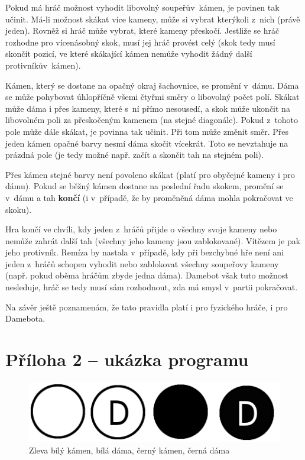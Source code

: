 \documentclass[a4paper,12pt]{article}
\newcommand{\priloha}[1]{\section*{#1}\addcontentsline{toc}{section}{#1}}
\begin{document}
	Pokud má hráč možnost vyhodit libovolný soupeřův~kámen, je povinen tak učinit. Má-li možnost skákat více kameny,
	může si vybrat kterýkoli z~nich (právě jeden). Rovněž si hráč může vybrat, které kameny přeskočí. Jestliže se hráč
	rozhodne pro vícenásobný skok, musí jej hráč provést celý (skok tedy musí skončit pozicí, ve které skákající kámen
	nemůže vyhodit žádný další protivníkův~kámen).
	
	Kámen, který se dostane na opačný okraj šachovnice, se promění v~dámu. Dáma se může pohybovat úhlopříčně všemi čtyřmi
	směry o libovolný počet polí. Skákat může dáma i přes kameny, které s~ní přímo nesousedí, a skok může ukončit na
	libovolném poli za přeskočeným kamenem (na stejné diagonále). Pokud z~tohoto pole může dále skákat, je povinna tak
	učinit. Při tom může změnit směr. Přes jeden kámen opačné barvy nesmí dáma skočit vícekrát. Toto se nevztahuje na prázdná
	pole (je tedy možné např. začít a skončit tah na stejném poli).
	
	Přes kámen stejné barvy není povoleno skákat (platí pro obyčejné kameny i pro dámu). Pokud se běžný kámen dostane
	na poslední řadu skokem, promění se v~dámu a tah \textbf{končí} (i v~případě, že by proměněná dáma mohla pokračovat
	ve skoku).
	
	Hra končí ve chvíli, kdy jeden z~hráčů přijde o všechny svoje kameny nebo nemůže zahrát další tah (všechny jeho kameny
	jsou zablokované). Vítězem je pak jeho protivník. Remíza by nastala v~případě, kdy při bezchybné hře není ani jeden
	z~hráčů schopen vyhodit nebo zablokovat všechny soupeřovy kameny (např. pokud oběma hráčům zbyde jedna dáma).
	Damebot však tuto možnost nesleduje, hráč se tedy musí sám rozhodnout, zda má smysl v~partii pokračovat.
	
	Na závěr ještě poznamenám, že tato pravidla platí i pro fyzického hráče, i pro Damebota.
	
	\priloha{Příloha 2 -- ukázka programu}
	\begin{figure}[h]
		\centering
		\includegraphics{img/kameny}
		\caption{Zleva bílý kámen, bílá dáma, černý kámen, černá dáma}
	\end{figure}
\end{document}
